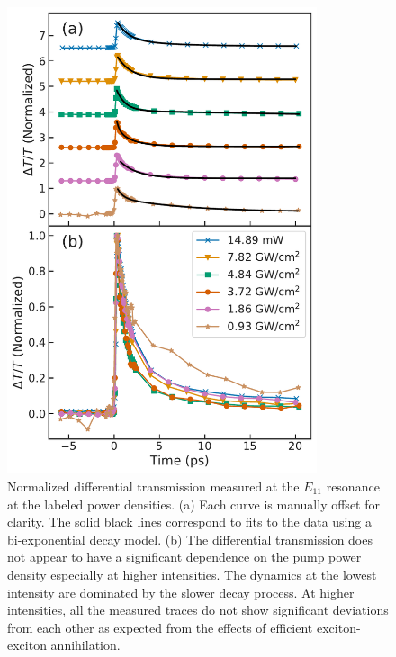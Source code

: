 \begin{figure}[ht]
	\centering
	\includegraphics[height=5.4in]{images/chapter_my_data/Weilu_CNT_diff_trans_fits_and_normalized}
	\caption{ Normalized differential transmission measured at the $E_{11}$ resonance at the labeled power densities. (a) Each curve is manually offset for clarity. The solid black lines correspond to fits to the data using a bi-exponential decay model. (b) The differential transmission does not appear to have a significant dependence on the pump power density especially at higher intensities. The dynamics at the lowest intensity are dominated by the slower decay process. At higher intensities, all the measured traces do not show significant deviations from each other as expected from the effects of efficient exciton-exciton annihilation. }
	\label{fig:weilu_cnt_normalized_dt}
\end{figure}




